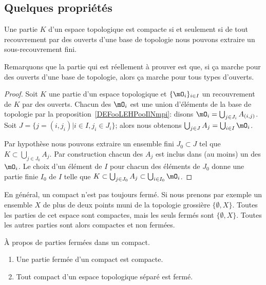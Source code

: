 \subsection{Quelques propriétés}

\begin{lemma}   \label{LemOWVooZKndbI}
	Une partie \( K\) d'un espace topologique est compacte si et seulement si de tout recouvrement par des ouverts d'une base de topologie nous pouvons extraire un sous-recouvrement fini.
\end{lemma}
Remarquons que la partie qui est réellement à prouver est que, si \og ça marche \fg{} pour des ouverts d'une base de topologie, alors \og ça marche\fg{} pour tous types d'ouverts.
\begin{proof}
	Soit \( K\) une partie d'un espace topologique et \( \{ \mO_i \}_{i\in I}\) un recouvrement de \( K\) par des ouverts. Chacun des \( \mO_i\) est une union d'éléments de la base de topologie par la proposition~\ref{DEFooLEHPooIlNmpi}: disons \( \mO_i = \bigcup_{j \in J_i} A_{(i,j)} \). Soit \( J = \{ j = (i, j_i) | i \in I, j_i \in J_i \} \); alors nous obtenons  \( \bigcup_{j\in J}A_j=\bigcup_{i\in I}\mO_i\).

	Par hypothèse nous pouvons extraire un ensemble fini \( J_0\subset J\) tel que \( K\subset\bigcup_{j\in J_0}A_j\). Par construction chacun des \( A_j\) est inclus dans (au moins) un des \( \mO_i\). Le choix d'un élément de \( I\) pour chacun des éléments de \( J_0\) donne une partie finie \( I_0\) de \( I\) telle que \( K\subset\bigcup_{j\in J_0}A_j\subset\bigcup_{i\in I_0}\mO_i\).
\end{proof}


\begin{example}
	En général, un compact n'est pas toujours fermé. Si nous prenons par exemple un ensemble \( X\) de plus de deux points muni de la topologie grossière \( \{ \emptyset,X \}\). Toutes les parties de cet espace sont compactes, mais les seuls fermés sont \( \{ \emptyset,X \}\). Toutes les autres parties sont alors compactes et non fermées.
\end{example}


\begin{lemma}   \label{LemnAeACf}
	À propos de parties fermées dans un compact.
	\begin{enumerate}
		\item       \label{ITEMooNKAKooQoNddr}
		      Une partie fermée d'un compact est compacte.
		\item       \label{ITEMooAZWVooLyPDeY}
		      Tout compact d'un espace topologique séparé est fermé.
	\end{enumerate}
\end{lemma}

